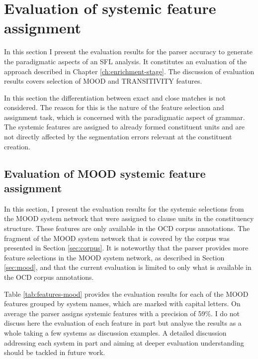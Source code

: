 \section{Evaluation of systemic feature assignment}
\label{sec:systemic-evaluation}
    
    In this section I present the evaluation results for the parser accuracy to generate the paradigmatic aspects of an SFL analysis. It constitutes an evaluation of the approach described in Chapter \ref{ch:enrichment-stage}. The discussion of evaluation results covers selection of MOOD and TRANSITIVITY features. %
    
    In this section the differentiation between exact and close matches is not considered. The reason for this is the nature of the feature selection and assignment task, which is concerned with the paradigmatic aspect of grammar. The systemic features are assigned to already formed constituent units and are not directly affected by the segmentation errors relevant at the constituent creation. 
    
\subsection{Evaluation of MOOD systemic feature assignment}
\label{sec:systemic-evaluation-MOOD}

    In this section, I present the evaluation results for the systemic selections from the MOOD system network that were assigned to clause units in the constituency structure. These features are only available in the OCD corpus annotations. The fragment of the MOOD system network that is covered by the corpus was presented in Section \ref{sec:corpus}. It is noteworthy that the parser provides more feature selections in the MOOD system network, as described in Section \ref{sec:mood}, and that the current evaluation is limited to only what is available in the OCD corpus annotations.

    Table \ref{tab:features-mood} provides the evaluation results for each of the MOOD features grouped by system names, which are marked with capital letters. On average the parser assigns systemic features with a precision of 59\%. I do not discuss here the evaluation of each feature in part but analyse the results as a whole taking a few systems as discussion examples. A detailed discussion addressing each system in part and aiming at deeper evaluation understanding should be tackled in future work.

